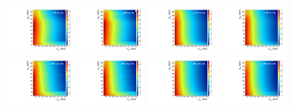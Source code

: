 \begin{figure}[htbp]
  \centering
  \includegraphics[width=0.2\textwidth]{fig/2Dfit/template_nonRes_mu_HP_bb_LDy.pdf}
  \includegraphics[width=0.2\textwidth]{fig/2Dfit/template_nonRes_e_HP_bb_LDy.pdf}
  \includegraphics[width=0.2\textwidth]{fig/2Dfit/template_nonRes_mu_LP_bb_LDy.pdf}
  \includegraphics[width=0.2\textwidth]{fig/2Dfit/template_nonRes_e_LP_bb_LDy.pdf}\\
  \includegraphics[width=0.2\textwidth]{fig/2Dfit/template_nonRes_mu_HP_nobb_LDy.pdf}
  \includegraphics[width=0.2\textwidth]{fig/2Dfit/template_nonRes_e_HP_nobb_LDy.pdf}
  \includegraphics[width=0.2\textwidth]{fig/2Dfit/template_nonRes_mu_LP_nobb_LDy.pdf}
  \includegraphics[width=0.2\textwidth]{fig/2Dfit/template_nonRes_e_LP_nobb_LDy.pdf}\\

\end{figure}
